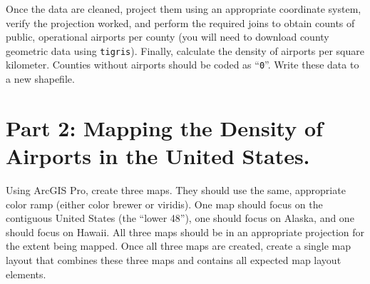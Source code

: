 \documentclass{tufte-handout}
\begin{document}
Once the data are cleaned, project them using an appropriate coordinate system, verify the projection worked, and perform the required joins to obtain counts of public, operational airports per county (you will need to download county geometric data using \texttt{tigris}). Finally, calculate the density of airports per square kilometer. Counties without airports should be coded as ``\texttt{0}''. Write these data to a new shapefile.

\vspace{5mm}
\section{Part 2: Mapping the Density of Airports in the United States.}
Using ArcGIS Pro, create three maps. They should use the same, appropriate color ramp (either color brewer or viridis). One map should focus on the contiguous United States (the ``lower 48''), one should focus on Alaska, and one should focus on Hawaii. All three maps should be in an appropriate projection for the extent being mapped. Once all three maps are created, create a single map layout that combines these three maps and contains all expected map layout elements.

\end{document}
